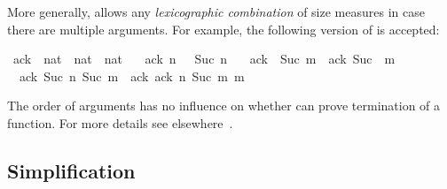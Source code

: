 \begin{isabellebody}
\begin{isamarkuptext}
More generally,  allows any \emph{lexicographic
combination} of size measures in case there are multiple
arguments. For example, the following version of  is accepted:%
\end{isamarkuptext}%
\isamarkuptrue%
\isamarkupfalse%
\ ack{}\ {\isacharcolon}{\isacharcolon}\ {\isachardoublequoteopen}nat\ {\isasymRightarrow}\ nat\ {\isasymRightarrow}\ nat{\isachardoublequoteclose}\ \isanewline
\ \ {\isachardoublequoteopen}ack{}\ n\ {}\ {\isacharequal}\ Suc\ n{\isachardoublequoteclose}\ {\isacharbar}\isanewline
\ \ {\isachardoublequoteopen}ack{}\ {}\ {\isacharparenleft}Suc\ m{\isacharparenright}\ {\isacharequal}\ ack{}\ {\isacharparenleft}Suc\ {}{\isacharparenright}\ m{\isachardoublequoteclose}\ {\isacharbar}\isanewline
\ \ {\isachardoublequoteopen}ack{}\ {\isacharparenleft}Suc\ n{\isacharparenright}\ {\isacharparenleft}Suc\ m{\isacharparenright}\ {\isacharequal}\ ack{}\ {\isacharparenleft}ack{}\ n\ {\isacharparenleft}Suc\ m{\isacharparenright}{\isacharparenright}\ m{\isachardoublequoteclose}%
\begin{isamarkuptext}%
The order of arguments has no influence on whether
 can prove termination of a function. For more details
see elsewhere~\cite{bulwahnKN07}.

\subsection{Simplification}
\label{sec:fun-simplification}


\end{isamarkuptext}
\end{isabellebody}
